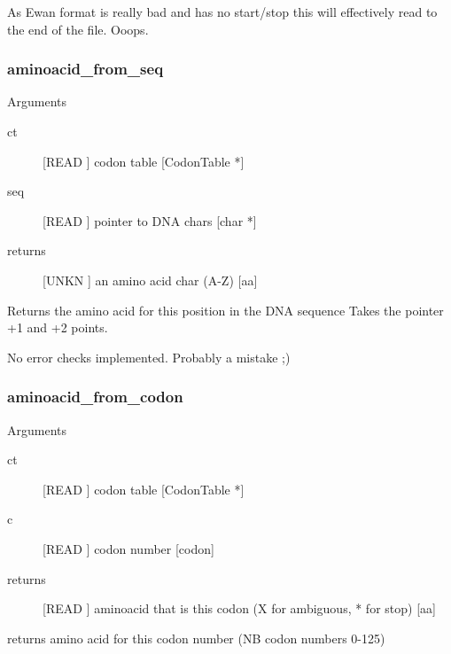 As Ewan format is really bad and has no start/stop
this will effectively read to the end of the file.
Ooops.


\subsubsection{aminoacid_from_seq}

Arguments
\begin{description}
\item[ct] [READ ] codon table [CodonTable *]
\item[seq] [READ ] pointer to DNA chars [char *]
\item[returns] [UNKN ] an amino acid char (A-Z) [aa]
\end{description}
Returns the amino acid for this position in the DNA sequence
Takes the pointer +1 and +2 points.


No error checks implemented. Probably a mistake ;)


\subsubsection{aminoacid_from_codon}

Arguments
\begin{description}
\item[ct] [READ ] codon table [CodonTable *]
\item[c] [READ ] codon number [codon]
\item[returns] [READ ] aminoacid that is this codon (X for ambiguous, * for stop) [aa]
\end{description}
returns amino acid for this codon number (NB codon numbers 0-125)


